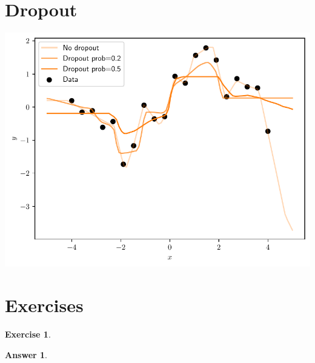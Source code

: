 \documentclass{article}
\newtheorem{exercise}{Exercise}
\newtheorem{answer}{Answer}
\newcommand{\0}{\mathbf{0}}
\begin{document}
\newpage
\section{Dropout}
\includegraphics[width=\textwidth]{dropout.pdf}

\section{Exercises}

\begin{exercise}
\end{exercise}

\begin{answer}
\end{answer}
\end{document}
